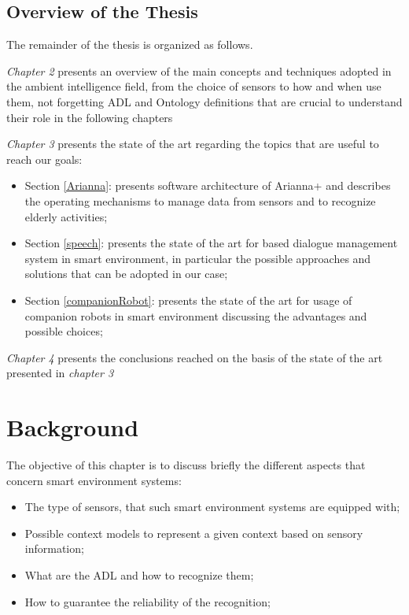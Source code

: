 \documentclass{thesisreport}
\begin{document}
\section{Overview of the Thesis}
The remainder of the thesis is organized as follows. 

\quad \textit{Chapter 2} presents an overview of the main concepts and techniques adopted in the ambient intelligence field, from the choice of sensors to how and when use them, not forgetting ADL and Ontology definitions that are crucial to understand their role in the following chapters

\quad \textit{Chapter 3} presents the state of the art regarding the topics that are useful to reach our goals:
\begin{itemize}
    \item Section \ref{Arianna}: presents software architecture of Arianna+ and describes the operating mechanisms to manage data from sensors and to recognize elderly activities;
    \item Section \ref{speech}: presents the state of the art for based dialogue management system in smart environment, in particular the possible approaches and solutions that can be adopted in our case;
    \item Section \ref{companionRobot}: presents the state of the art for usage of companion robots in smart environment discussing the advantages and possible choices;
\end{itemize}
\quad \textit{Chapter 4} presents the conclusions reached on the basis of the state of the art presented in \textit{chapter 3}

 \chapter{Background}
The objective of this chapter is to discuss briefly the different aspects that concern smart environment systems:
\begin{itemize}
    \item The type of sensors, that such smart environment systems are  equipped with;
    \item Possible context models to represent a given context based on sensory information;
    \item What are the ADL and how to recognize them;
    \item How to guarantee the reliability of the recognition;
\end{itemize}
\end{document}
